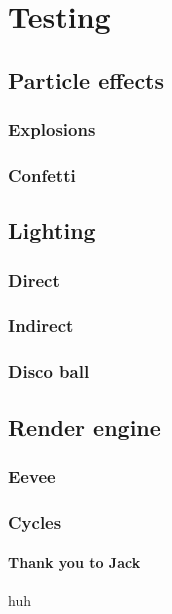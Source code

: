 \documentclass{article}
\begin{document}
\tableofcontents
\section{Testing}
\label{sec:org8f4f098}
\subsection{Particle effects}
\label{sec:org466c359}
\subsubsection{Explosions}
\label{sec:org48b7e8f}
\subsubsection{Confetti}
\label{sec:orgc19d5ab}
\subsection{Lighting}
\label{sec:orgcaca2d7}
\subsubsection{Direct}
\label{sec:orgee12393}
\subsubsection{Indirect}
\label{sec:org9457f4f}
\subsubsection{Disco ball}
\label{sec:org50c698f}
\subsection{Render engine}
\label{sec:org67b78ef}
\subsubsection{Eevee}
\label{sec:org28f8243}
\subsubsection{Cycles}
\label{sec:org5805e52}
\paragraph{Thank you to Jack}
\label{sec:org6c432d0}
huh
\end{document}
